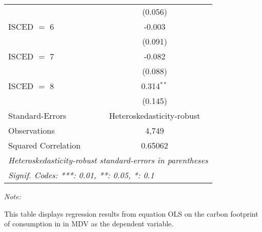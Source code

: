 \begin{table}[htbp!]
\begin{adjustbox}{width = 1\textwidth, max height = 0.95\textheight, center}
\begin{threeparttable}[b]
\begin{tabular}{lc}
                                & (0.056)\\   
            ISCED $=$ 6         & -0.003\\   
                                & (0.091)\\   
            ISCED $=$ 7         & -0.082\\   
                                & (0.088)\\   
            ISCED $=$ 8         & 0.314$^{**}$\\   
                                & (0.145)\\   
            \midrule 
            Standard-Errors     & Heteroskedasticity-robust \\   
            Observations        & 4,749\\  
            Squared Correlation & 0.65062\\  
            \midrule \midrule
            \multicolumn{2}{l}{\emph{Heteroskedasticity-robust standard-errors in parentheses}}\\
            \multicolumn{2}{l}{\emph{Signif. Codes: ***: 0.01, **: 0.05, *: 0.1}}\\
         \end{tabular}
         
         \begin{tablenotes}\item \medskip \textit{Note:}
            \item This table displays regression results from equation OLS on the carbon footprint of consumption in  in MDV as the dependent variable.  
         \end{tablenotes}
      \end{threeparttable}
   \end{adjustbox}
\end{table}


